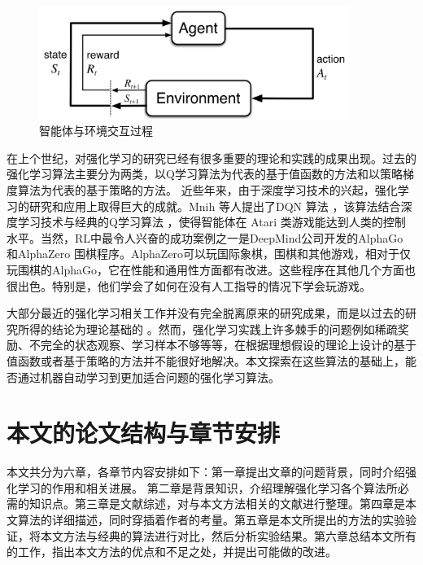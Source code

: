 \begin{figure}[h]
	\centering
	\includegraphics[width=0.9\textwidth]{image/chap01/interaction.png}
	\caption{智能体与环境交互过程\cite{suttonReinforcementLearningIntroduction2018}}
 	\label{fig:agent-env-interaction}
\end{figure}

在上个世纪，对强化学习的研究已经有很多重要的理论和实践的成果出现\cite{suttonReinforcementLearningIntroduction2018}。过去的强化学习算法主要分为两类，以Q学习\cite{watkinsQlearning1992}算法为代表的基于值函数的方法和以策略梯度\cite{mnihAsynchronousMethodsDeep2016}算法为代表的基于策略的方法。
近些年来，由于深度学习技术的兴起，强化学习的研究和应用上取得巨大的成就。Mnih 等人提出了DQN 算法\cite{mnihPlayingAtariDeep2013} \cite{mnihHumanlevelControlDeep2015}，该算法结合深度学习技术与经典的Q学习算法 \cite{watkinsQlearning1992}，使得智能体在 Atari 类游戏能达到人类的控制水平。当然，RL中最令人兴奋的成功案例之一是DeepMind公司开发的AlphaGo \cite{silverMasteringGameGo2016} 和AlphaZero \cite{silverMasteringGameGo2017} 围棋程序。AlphaZero可以玩国际象棋，围棋和其他游戏，相对于仅玩围棋的AlphaGo，它在性能和通用性方面都有改进。这些程序在其他几个方面也很出色。特别是，他们学会了如何在没有人工指导的情况下学会玩游戏。

大部分最近的强化学习相关工作并没有完全脱离原来的研究成果，而是以过去的研究所得的结论为理论基础的 \cite{ohDiscoveringReinforcementLearning2020}。然而，强化学习实践上许多棘手的问题例如稀疏奖励、不完全的状态观察、学习样本不够等等，在根据理想假设的理论上设计的基于值函数或者基于策略的方法并不能很好地解决。本文探索在这些算法的基础上，能否通过机器自动学习到更加适合问题的强化学习算法。


\section{本文的论文结构与章节安排}
\label{sec:arrangement}

本文共分为六章，各章节内容安排如下：第一章提出文章的问题背景，同时介绍强化学习的作用和相关进展。 第二章是背景知识，介绍理解强化学习各个算法所必需的知识点。第三章是文献综述，对与本文方法相关的文献进行整理。第四章是本文算法的详细描述，同时穿插着作者的考量。第五章是本文所提出的方法的实验验证，将本文方法与经典的算法进行对比，然后分析实验结果。第六章总结本文所有的工作，指出本文方法的优点和不足之处，并提出可能做的改进。
